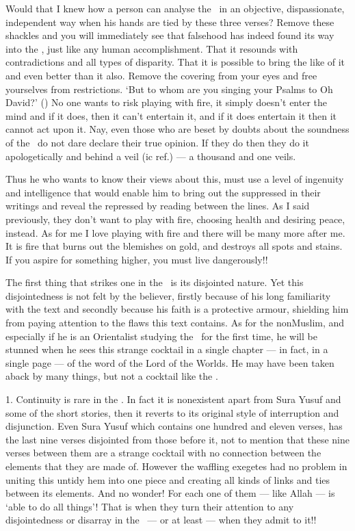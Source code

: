 \documentclass[12pt]{memoir}
\renewcommand\pardivider{\centerline{\ar{۞۞۞}}}
\begin{document}
Would that I knew how a person can analyse the \Quran\ in an objective,
dispassionate, independent way when his hands are tied by these three verses?
Remove these shackles and you will immediately see that falsehood
has indeed found its way into the \Quran,
just like any human accomplishment.
That it resounds with contradictions and all types of disparity.
That it is possible to bring the like of it and even better than it also.
Remove the covering from your eyes and free yourselves from restrictions.
‘But to whom are you singing your Psalms to Oh David?’
()
No one wants to risk playing with fire,
it simply doesn’t enter the mind and if it does,
then it can’t entertain it, and if it does entertain it
then it cannot act upon it.
Nay, even those who are beset by doubts about the soundness of the \Quran\
do not dare declare their true opinion.
If they do then they do it apologetically and behind a veil (\Quran{}ic ref.) —
a thousand and one veils.

Thus he who wants to know their views about this,
must use a level of ingenuity and intelligence
that would enable him to bring out the suppressed in their writings
and reveal the repressed by reading between the lines.
As I said previously, they don’t want to play with fire,
choosing health and desiring peace, instead.
As for me I love playing with fire and there will be many more after me.
It is fire that burns out the blemishes on gold,
and destroys all spots and stains.
If you aspire for something higher, you must live dangerously!!

\pardivider

The first thing that strikes one in the \Quran\ is its disjointed nature.
Yet this disjointedness is not felt by the believer,
firstly because of his long familiarity with the text and secondly
because his faith is a protective armour,
shielding him from paying attention to the flaws this text contains.
As for the non\–Muslim, and especially if he is an Orientalist
studying the \Quran\ for the first time,
he will be stunned when he sees this strange cocktail in a single chapter —
in fact, in a single page — of the word of the Lord of the Worlds.
He may have been taken aback by many things,
but not a cocktail like the \Quran.

1. Continuity is rare in the \Quran.
In fact it is non\–existent apart from Sura Yusuf
and some of the short stories,
then it reverts to its original style of interruption and disjunction.
Even Sura Yusuf which contains one hundred and eleven verses,
has the last nine verses disjointed from those before it,
not to mention that these nine verses between them are a strange cocktail
with no connection between the elements that they are made of.
However the waffling exegetes had no problem in uniting this untidy hem
into one piece and creating all kinds of links and ties between its elements.
And no wonder! For each one of them — like Allah — is ‘able to do all things’!
That is when they turn their attention to any disjointedness
or disarray in the \Quran\ — or at least — when they admit to it!!
\end{document}
